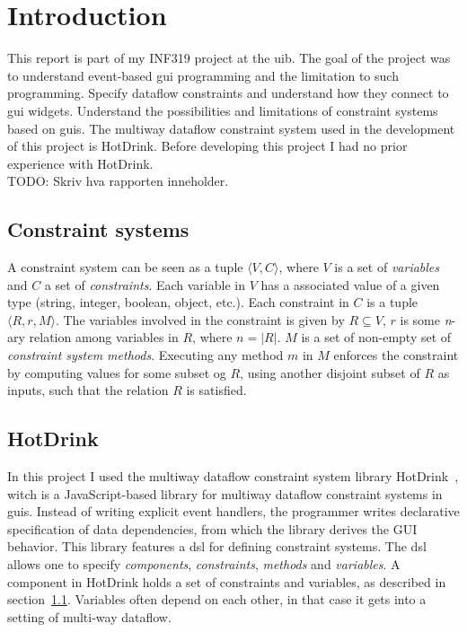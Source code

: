 \chapter{Introduction}

This report is part of my INF319 project at the \gls{uib}. The goal of the project was to
understand event-based \gls{gui} programming and the limitation to such programming.
Specify dataflow constraints and understand how they connect to \gls{gui} widgets.
Understand the possibilities and limitations of constraint systems based on \gls{gui}s.
The multiway dataflow constraint system used in the development of this project is
HotDrink. Before developing this project I had no prior experience with HotDrink. 
\\TODO: Skriv hva rapporten inneholder.
\newpage

\section{Constraint systems}
\label{sec:constraint-systems}
A constraint system can be seen as a tuple ${\langle V, C \rangle}$, where $V$ is a set 
of \textit{variables} and $C$ a set of \textit{constraints}. Each variable in $V$ has a 
associated value of a given type (string, integer, boolean, object, etc.). Each 
constraint in $C$ is a tuple ${\langle R, r, M \rangle}$. The variables involved in the 
constraint is given by ${R \subseteq V}$, $r$ is some \textit{n}-ary relation among 
variables in $R$, where ${n = \lvert R \rvert}$. $M$ is a set of non-empty set of 
\textit{constraint system methods}. Executing any method $m$ in $M$ enforces the 
constraint by computing values for some subset og $R$, using another disjoint subset of 
$R$ as inputs, such that the relation $R$ is satisfied. 

\section{HotDrink}

In this project I used the multiway dataflow constraint system library 
HotDrink~\cite{HotDrink}, witch is a JavaScript-based library for multiway dataflow 
constraint systems in \gls{gui}s. Instead of writing explicit event handlers,
the programmer writes declarative specification of data dependencies,
from which the library derives the GUI behavior.
This library features a \gls{dsl} for defining constraint systems.
The \gls{dsl} allows one to specify \emph{components}, \emph{constraints}, \emph{methods} 
and \emph{variables}.
A component in HotDrink holds a set of constraints and variables, as described in 
section~\ref{sec:constraint-systems}. Variables often depend on each other,
in that case it gets into a setting of multi-way dataflow.

